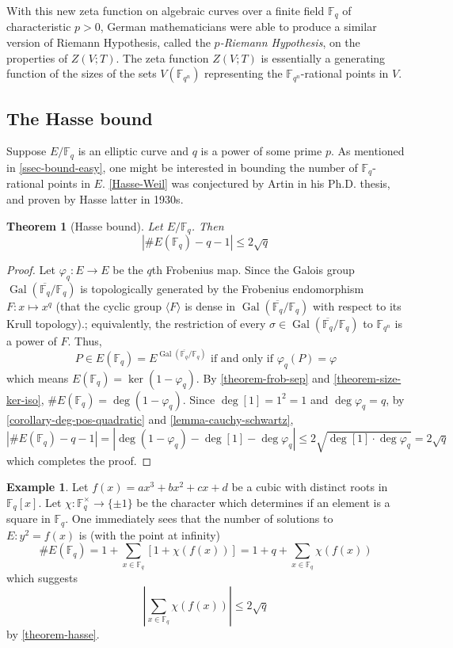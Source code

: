 \documentclass[12pt]{article}
\newtheorem{theorem}{Theorem}[subsection]
\theoremstyle{remark}
\theoremstyle{definition}
\newtheorem{example}{Example}[subsection]
\newcommand{\s}[0]{\sigma}
\newcommand{\F}[0]{\mathbb{F}}
\newcommand{\Gal}[0]{\operatorname{Gal}}
\begin{document}
        With this new zeta function on algebraic curves over a finite field $\F_q$ of characteristic $p>0$, German mathematicians were able to produce a similar version of Riemann Hypothesis, called the \textit{$p$-Riemann Hypothesis}, on the properties of $Z(V;T)$. The zeta function $Z(V;T)$ is essentially a generating function of the sizes of the sets $V(\F_{q^n})$ representing the $\F_{q^n}$-rational points in $V$. 
        
    \subsection{The Hasse bound}\label{ssec-hasse-bound}
        Suppose $E/\F_q$ is an elliptic curve and $q$ is a power of some prime $p$. As mentioned in \autoref{ssec-bound-easy}, one might be interested in bounding the number of $\F_q$-rational points in $E$. \autoref{Hasse-Weil} was conjectured by Artin in his Ph.D. thesis, and proven by Hasse latter in 1930s.
        \begin{theorem}[Hasse bound]\label{theorem-hasse}
            Let $E/\F_q$. Then
            \[|\# E(\F_q)-q-1|\leqslant 2\sqrt{q}\]
        \end{theorem}
        \begin{proof}
            Let $\varphi_q:E\to E$ be the $q$th Frobenius map. Since the Galois group $\Gal(\overline{\F_q}/\F_q)$ is topologically generated by the Frobenius endomorphism $F:x\mapsto x^q$ (that the cyclic group $\langle F\rangle$ is dense in $\Gal(\overline{\F_q}/\F_q)$ with respect to its Krull topology).; equivalently, the restriction of every $\s\in\Gal(\overline{\F_q}/\F_q)$ to $\F_{q^n}$ is a power of $F$. Thus,
            \[P\in E(\F_q)=E^{\Gal(\overline{\F_q}/\F_q)}\text{ if and only if }\varphi_q(P)=\varphi\]
            which means $E(\F_q)=\ker(1-\varphi_q)$. By \autoref{theorem-frob-sep} and \autoref{theorem-size-ker-iso}, $\# E(\F_q)=\deg(1-\varphi_q)$. Since $\deg [1]=1^2=1$ and $\deg \varphi_q=q$, by \autoref{corollary-deg-pos-quadratic} and \autoref{lemma-cauchy-schwartz},
            \[|\# E(\F_q)-q-1|=|\deg(1-\varphi_q)-\deg[1]-\deg\varphi_q|\leqslant 2\sqrt{\deg[1]\cdot\deg\varphi_q}=2\sqrt{q}\]
            which completes the proof.
        \end{proof}
        \begin{example}
            Let $f(x)=ax^3+bx^2+cx+d$ be a cubic with distinct roots in $\F_q[x]$. Let $\chi:\F_q^\times\to\{\pm 1\}$ be the character which determines if an element is a square in $\F_q$. One immediately sees that the number of solutions to $E:y^2=f(x)$ is (with the point at infinity)
            \[\# E(\F_q)=1+\sum_{x\in \F_q}\left[1+\chi\left(f(x)\right)\right]=1+q+\sum_{x\in\F_q}\chi\left(f(x)\right)\]
            which suggests
            \[\left|\sum_{x\in\F_q}\chi\left(f(x)\right)\right|\leqslant 2\sqrt{q}\]
            by \autoref{theorem-hasse}.
        \end{example}
\end{document}

